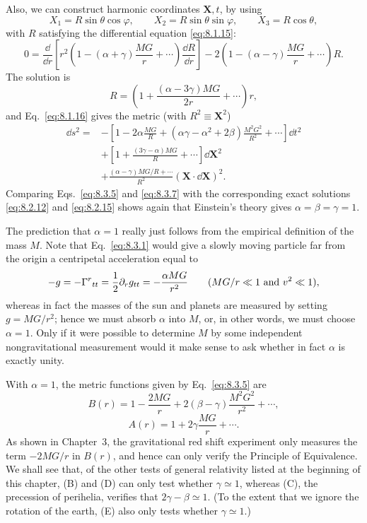 Also, we can construct harmonic coordinates \(\mathbf{X},t\), by using
\[
  X_1=R\sin\theta\cos\varphi,\qquad
  X_2=R\sin\theta\sin\varphi,\qquad
  X_3=R\cos\theta,
\]
with \(R\) satisfying the differential equation \eqref{eq:8.1.15}:
\[
  0
  =
  \frac{\dd}{\dd r}
  \left[
    r^2\left(1-(\alpha+\gamma)\frac{MG}{r}+\cdots\right)
    \frac{\dd R}{\dd r}
  \right]
  -2\left(1-(\alpha-\gamma)\frac{MG}{r}+\cdots\right)R.
\]
The solution is
\begin{equation}
  R
  =
  \left(1+\frac{(\alpha-3\gamma)MG}{2r}+\cdots\right)r,
  \tag{8.3.6}\label{eq:8.3.6}
\end{equation}
and Eq.~\eqref{eq:8.1.16} gives the metric (with
\(R^2\equiv\mathbf{X}^2\))
\begin{equation}
  \begin{split}
  \dd s^2={}&
  -\left[
    1-2\alpha\frac{MG}{R}
    +(\alpha\gamma-\alpha^2+2\beta)\frac{M^2G^2}{R^2}
    +\cdots
  \right]\dd t^2\\
  &+
  \left[1+\frac{(3\gamma-\alpha)MG}{R}+\cdots\right]
  \dd\mathbf{X}^2\\
  &+
  \frac{(\alpha-\gamma)MG/R+\cdots}{R^2}
  (\mathbf{X}\cdot \dd\mathbf{X})^2.
  \end{split}
  \tag{8.3.7}\label{eq:8.3.7}
\end{equation}
Comparing Eqs.~\eqref{eq:8.3.5} and \eqref{eq:8.3.7} with the
corresponding exact solutions \eqref{eq:8.2.12} and \eqref{eq:8.2.15}
shows again that Einstein's theory gives \(\alpha=\beta=\gamma=1\).

The prediction that \(\alpha=1\) really just follows from the empirical
definition of the mass \(M\). Note that Eq.~\eqref{eq:8.3.1} would give a
slowly moving particle far from the origin a centripetal acceleration equal
to
\[
  -g=-\Gamma^r{}_{tt}
  =\frac12\partial_r g_{tt}
  =-\frac{\alpha MG}{r^2}
  \qquad
  (MG/r\ll1\ \hbox{and}\ v^2\ll1),
\]
whereas in fact the masses of the sun and planets are measured by setting
\(g=MG/r^2\); hence we must absorb \(\alpha\) into \(M\), or, in other
words, we must choose \(\alpha=1\). Only if it were possible to determine
\(M\) by some independent nongravitational measurement would it make sense
to ask whether in fact \(\alpha\) is exactly unity.

With \(\alpha=1\), the metric functions given by Eq.~\eqref{eq:8.3.5}
are
\begin{equation}
  B(r)
  =
  1-\frac{2MG}{r}
  +2(\beta-\gamma)\frac{M^2G^2}{r^2}+\cdots,
  \tag{8.3.8}\label{eq:8.3.8}
\end{equation}
\begin{equation}
  A(r)=1+2\gamma\frac{MG}{r}+\cdots.
  \tag{8.3.9}\label{eq:8.3.9}
\end{equation}
As shown in Chapter~3, the gravitational red shift experiment only
measures the term \(-2MG/r\) in \(B(r)\), and hence can only verify the
Principle of Equivalence. We shall see that, of the other tests of general
relativity listed at the beginning of this chapter, (B) and (D) can only
test whether \(\gamma\simeq1\), whereas (C), the precession of perihelia,
verifies that \(2\gamma-\beta\simeq1\). (To the extent that we ignore the
rotation of the earth, (E) also only tests whether \(\gamma\simeq1\).)
